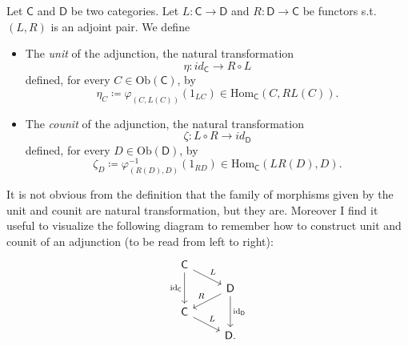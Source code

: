 \begin{defn}
	Let $\mathsf{C}$ and $\mathsf{D}$ be two categories.
	Let $L\colon \mathsf{C} \to \mathsf{D}$ and $R\colon \mathsf{D} \to \mathsf{C}$ be functors
	s.t. $\left(L, R\right)$ is an adjoint pair.
	We define
	\begin{itemize}
		\item The {\em unit} of the adjunction, the natural transformation
			\begin{equation}
			\eta\colon id_{\mathsf{C}} \to R \circ L
			\end{equation} 
			defined, for every $C \in \mathrm{Ob} \left(\mathsf{C}\right)$, by
			\begin{equation}
				\eta_C \coloneqq \varphi_{(C, L(C))} \left( 1_{LC} \right) \in \mathrm{Hom}_{\mathsf{C}} \left( C, RL(C) \right)
			.\end{equation} 
		\item The {\em counit} of the adjunction, the natural transformation
			\begin{equation}
			\zeta\colon L \circ R \to id_{\mathsf{D}}
			\end{equation} 
			defined, for every $D \in \mathrm{Ob} \left(\mathsf{D}\right)$, by
			\begin{equation}
				\zeta_D \coloneqq \varphi_{(R(D), D)}^{-1} \left( 1_{RD} \right) \in \mathrm{Hom}_{\mathsf{C}} \left( LR(D), D \right)
			.\end{equation} 
	\end{itemize}
\end{defn}

\begin{rem}[]
	It is not obvious from the definition that the family of morphisms given by the unit and counit
	are natural transformation, but they are.
	Moreover I find it useful to visualize the following diagram to remember how to construct
	unit and counit of an adjunction (to be read from left to right):
	\begin{equation}
	\begin{tikzcd}[row sep=0.7em]
		\mathsf{C} \arrow[rd, "L", rightarrow] 
		\arrow[dd, "\mathrm{id}_{ \mathsf{C} }"', rightarrow] 
		& \\
		& \mathsf{D} 
		\arrow[dd, "\mathrm{id}_{ \mathsf{D} }", rightarrow] 
		\arrow[ld, "R"', rightarrow] \\
		\mathsf{C} \arrow[rd, "L", rightarrow] 
		& \\
		& \mathsf{D}
	.\end{tikzcd}
	\end{equation}
\end{rem}

